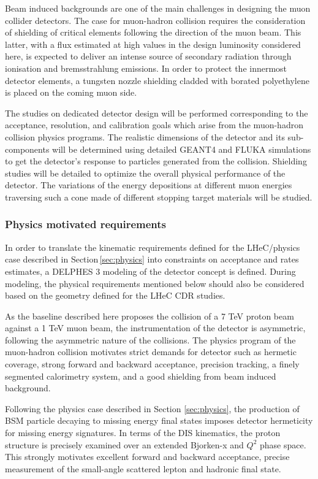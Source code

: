 Beam induced backgrounds are one of the main challenges in designing the muon collider detectors. The case for muon-hadron collision requires the consideration of shielding of critical elements following the direction of the muon beam. This latter, with a flux estimated at high values in the design luminosity considered here, is expected to deliver an intense source of secondary radiation through ionisation and bremsstrahlung emissions. In order to protect the innermost detector elements, a tungsten nozzle shielding cladded with borated polyethylene is placed on the coming muon side.

The studies on dedicated detector design will be performed corresponding to the acceptance, resolution, and calibration goals which arise from the muon-hadron collision physics programs. The realistic dimensions of the detector and its sub-components will be determined using detailed GEANT4 and FLUKA simulations to get the detector's response to particles generated from the collision. Shielding studies will be detailed to optimize the overall physical performance of the detector. The variations of the energy depositions at different muon energies traversing such a cone made of different stopping target materials will be studied. 


\subsubsection{Physics motivated requirements}

In order to translate the kinematic requirements defined for the LHeC/\lhuc physics case described in Section\,\ref{sec:physics} into constraints on acceptance and rates estimates, a {DELPHES} 3 \cite{deFavereau:2013fsa} modeling of the detector concept is defined. During modeling, the physical requirements mentioned below should also be considered based on the geometry defined for the LHeC CDR studies.


As the baseline \lhuc described here proposes the collision of a 7 TeV proton beam against a 1 TeV muon beam, the instrumentation of the detector is asymmetric, following the asymmetric nature of the collisions.
The physics program of the muon-hadron collision motivates strict demands for detector such as hermetic coverage, strong forward and backward acceptance, precision tracking, a finely segmented calorimetry system, and a good shielding from beam induced background. 

Following the physics case described in Section \ref{sec:physics}, the production of BSM particle decaying to missing energy final states imposes detector hermeticity for missing energy signatures.
In terms of the DIS kinematics, the proton structure is precisely examined over an extended Bjorken-x and $Q^2$ phase space. This strongly motivates excellent forward and backward acceptance, precise measurement of the small-angle scattered lepton and hadronic final state.


